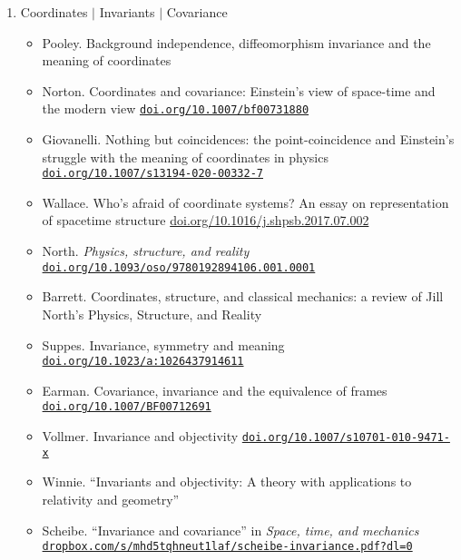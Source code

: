 \documentclass[11pt]{article}
\newcommand\rurl[1]{%
  \href{http://#1}{\nolinkurl{#1}}%
}
\begin{document}
\begin{enumerate}

\item Coordinates $|$ Invariants $|$ Covariance
  \begin{itemize}
  \item Pooley. Background independence, diffeomorphism invariance and
    the meaning of coordinates
  \item Norton. Coordinates and covariance: Einstein's view of
    space-time and the modern view \rurl{doi.org/10.1007/bf00731880}
  \item Giovanelli. Nothing but coincidences: the point-coincidence
    and Einstein's struggle with the meaning of coordinates in
    physics \rurl{doi.org/10.1007/s13194-020-00332-7}
  \item Wallace. Who's afraid of coordinate systems? An essay on
    representation of spacetime structure
    \url{doi.org/10.1016/j.shpsb.2017.07.002}
  \item North. \emph{Physics, structure, and reality}
    \rurl{doi.org/10.1093/oso/9780192894106.001.0001}
  \item Barrett. Coordinates, structure, and classical mechanics: a
    review of Jill North’s Physics, Structure, and Reality
  \item Suppes. Invariance, symmetry and meaning
    \rurl{doi.org/10.1023/a:1026437914611}
  \item Earman. Covariance, invariance and the equivalence of
    frames \rurl{doi.org/10.1007/BF00712691}
  \item Vollmer. Invariance and objectivity
    \rurl{doi.org/10.1007/s10701-010-9471-x}
  \item Winnie. ``Invariants and objectivity: A theory with
    applications to relativity and geometry''  
  \item Scheibe. ``Invariance and covariance'' in \textit{Space, time, and mechanics}
    \rurl{dropbox.com/s/mhd5tqhneut1laf/scheibe-invariance.pdf?dl=0}
  \end{itemize}

  

\end{enumerate}
\end{document}
